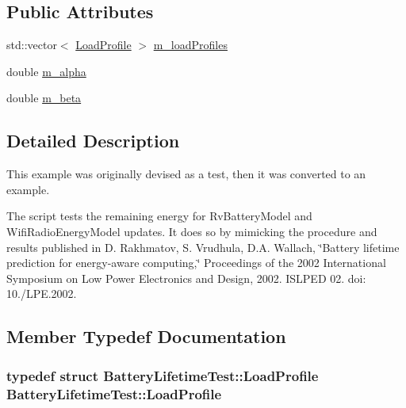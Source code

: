 \subsection*{Public Attributes}
\begin{DoxyCompactItemize}
\item 
std\+::vector$<$ \hyperlink{structBatteryLifetimeTest_1_1LoadProfile}{Load\+Profile} $>$ \hyperlink{classBatteryLifetimeTest_aee9ad324da18f58ee75689778580c3fb}{m\+\_\+load\+Profiles}
\item 
double \hyperlink{classBatteryLifetimeTest_ab0ea71a3ce518e4876ee4a0efe8a967c}{m\+\_\+alpha}
\item 
double \hyperlink{classBatteryLifetimeTest_a7e071f34e550450909e80907d59923c8}{m\+\_\+beta}
\end{DoxyCompactItemize}


\subsection{Detailed Description}
This example was originally devised as a test, then it was converted to an example.

The script tests the remaining energy for Rv\+Battery\+Model and Wifi\+Radio\+Energy\+Model updates. It does so by mimicking the procedure and results published in D. Rakhmatov, S. Vrudhula, D.\+A. Wallach, \char`\"{}\+Battery lifetime prediction for energy-\/aware computing,\char`\"{} Proceedings of the 2002 International Symposium on Low Power Electronics and Design, 2002. I\+S\+L\+P\+ED \textquotesingle{}02. doi\+: 10./\+L\+PE.2002. 

\subsection{Member Typedef Documentation}
\subsubsection[{\texorpdfstring{Load\+Profile}{LoadProfile}}]{\setlength{\rightskip}{0pt plus 5cm}typedef struct {\bf Battery\+Lifetime\+Test\+::\+Load\+Profile}  {\bf Battery\+Lifetime\+Test\+::\+Load\+Profile}}\hypertarget{classBatteryLifetimeTest_a0a7dbe56f76bd35b61e1c8477c07d42d}{}\label{classBatteryLifetimeTest_a0a7dbe56f76bd35b61e1c8477c07d42d}


